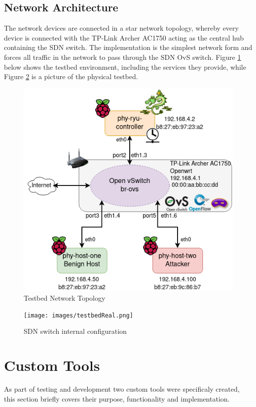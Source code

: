 \documentclass[12pt, oneside]{book}
\begin{document}
\subsection{Network Architecture}
The network devices are connected in a star network topology, whereby every device is connected with the TP-Link Archer AC1750
acting as the central hub containing the SDN switch. The implementation is the simplest network form and forces all traffic 
in the network to pass through the SDN OvS switch. Figure \ref{fig:testbednet} below shows the testbed environment, including
the services they provide, while Figure \ref{fig:physicalTestbed} is a picture of the physical testbed.

\begin{figure}[H]
	\centering
	\includegraphics[scale=0.65]{images/networktopo.png}
	\caption{Testbed Network Topology}
	\label{fig:testbednet}
\end{figure}

\begin{figure}[H]
	\centering
	\texttt{[image: images/testbedReal.png]}
	\caption{SDN switch internal configuration}
	\label{fig:physicalTestbed}
\end{figure}

\section{Custom Tools}
As part of testing and development two custom tools were specificaly created,
this section briefly covers their purpose, functionality and implementation.
\end{document}
